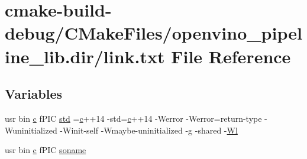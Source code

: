 \hypertarget{CMakeFiles_2openvino__pipeline__lib_8dir_2link_8txt}{}\section{cmake-\/build-\/debug/\+C\+Make\+Files/openvino\+\_\+pipeline\+\_\+lib.dir/link.txt File Reference}
\label{CMakeFiles_2openvino__pipeline__lib_8dir_2link_8txt}
\subsection*{Variables}
\begin{DoxyCompactItemize}
\item 
usr bin \hyperlink{CMakeCache_8txt_aac1d6a1710812201527c735f7c6afbaa}{c} f\+P\+IC \hyperlink{CMakeFiles_2openvino__pipeline__lib_8dir_2link_8txt_a5f87c8f8e33670f7c8c5221b6be1bcc4}{std} =\hyperlink{CMakeCache_8txt_aac1d6a1710812201527c735f7c6afbaa}{c}++14 -\/std=\hyperlink{CMakeCache_8txt_aac1d6a1710812201527c735f7c6afbaa}{c}++14 -\/Werror -\/Werror=return-\/type -\/Wuninitialized -\/Winit-\/self -\/Wmaybe-\/uninitialized -\/g -\/shared -\/\hyperlink{thirdparty_2extension_2CMakeFiles_2cpu__extension_8dir_2link_8txt_af9ccbf658ed2deb89d0d79f211e5b033}{Wl}
\item 
usr bin \hyperlink{CMakeCache_8txt_aac1d6a1710812201527c735f7c6afbaa}{c} f\+P\+IC \hyperlink{CMakeFiles_2openvino__pipeline__lib_8dir_2link_8txt_ab65a9b6457c4853ed17f89f945516e66}{soname}
\item 

\end{DoxyCompactItemize}
